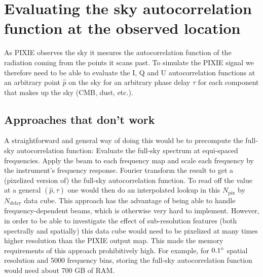 \documentclass{article}
\begin{document}

\section{Evaluating the sky autocorrelation function at the observed location}
As PIXIE observes the sky it mesures the autocorrelation function of the
radiation coming from the points it scans past. To simulate the PIXIE signal
we therefore need to be able to evaluate the I, Q and U autocorrelation functions at
an arbitrary point $\hat p$ on the sky for an arbitrary phase delay $\tau$
for each component that makes up the sky (CMB, dust, etc.).

\subsection{Approaches that don't work}
A straightforward and general way of doing this would be to precompute the
full-sky autocorrelation function: Evaluate the full-sky spectrum at equi-spaced
frequencies. Apply the beam to each frequency map and scale each frequency by
the instrument's frequency response. Fourier transform the result
to get a (pixelized version of) the full-sky autocorrelation function. To read off
the value at a general $(\hat p, \tau)$ one would then do an interpolated lookup
in this $N_\textrm{pix}$ by $N_\textrm{delay}$ data cube. This approach has the
advantage of being able to handle frequency-dependent beams, which is otherwise
very hard to implement. However, in order to be able to investigate the effect
of sub-resolution features (both spectrally and spatially) this data cube would
need to be pixelized at many times higher resolution than the PIXIE output map.
This made the memory requirements of this approach prohibitively high. For example,
for $0.1\degree$ spatial resolution and 5000 frequency bins, storing the full-sky
autocorrelation function would need about 700 GB of RAM.
\end{document}
